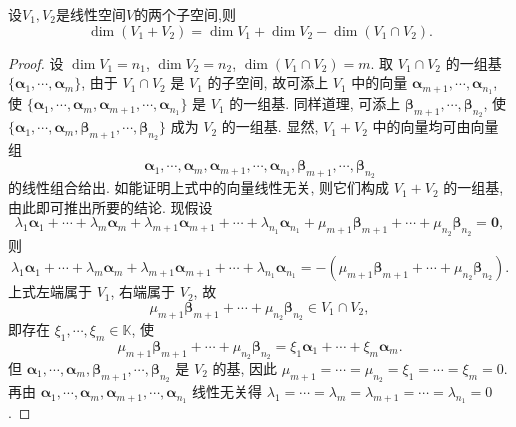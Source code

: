 \documentclass[../../main.tex]{subfiles}%
\begin{document}
\begin{theorem}[交和空间维数公式]\label{theorem:交和空间维数公式}
设\(V_1,V_2\)是线性空间\(V\)的两个子空间,则
\[
\dim(V_1 + V_2)=\dim V_1+\dim V_2-\dim(V_1\cap V_2).
\]
\end{theorem}
\begin{proof}

设 $\dim V_1 = n_1$, $\dim V_2 = n_2$, $\dim(V_1 \cap V_2) = m$. 取 $V_1 \cap V_2$ 的一组基 $\{\boldsymbol{\alpha}_1, \cdots, \boldsymbol{\alpha}_m\}$, 由于 $V_1 \cap V_2$ 是 $V_1$ 的子空间, 故可添上 $V_1$ 中的向量 $\boldsymbol{\alpha}_{m + 1}, \cdots, \boldsymbol{\alpha}_{n_1}$, 使 $\{\boldsymbol{\alpha}_1, \cdots, \boldsymbol{\alpha}_m, \boldsymbol{\alpha}_{m + 1}, \cdots, \boldsymbol{\alpha}_{n_1}\}$ 是 $V_1$ 的一组基. 同样道理, 可添上 $\boldsymbol{\beta}_{m + 1}, \cdots, \boldsymbol{\beta}_{n_2}$, 使 $\{\boldsymbol{\alpha}_1, \cdots, \boldsymbol{\alpha}_m, \boldsymbol{\beta}_{m + 1}, \cdots, \boldsymbol{\beta}_{n_2}\}$ 成为 $V_2$ 的一组基. 显然, $V_1 + V_2$ 中的向量均可由向量组
$$
\boldsymbol{\alpha}_1, \cdots, \boldsymbol{\alpha}_m, \boldsymbol{\alpha}_{m + 1}, \cdots, \boldsymbol{\alpha}_{n_1}, \boldsymbol{\beta}_{m + 1}, \cdots, \boldsymbol{\beta}_{n_2}
$$
的线性组合给出. 如能证明上式中的向量线性无关, 则它们构成 $V_1 + V_2$ 的一组基, 由此即可推出所要的结论. 现假设
$$
\lambda_1\boldsymbol{\alpha}_1 + \cdots + \lambda_m\boldsymbol{\alpha}_m + \lambda_{m + 1}\boldsymbol{\alpha}_{m + 1} + \cdots + \lambda_{n_1}\boldsymbol{\alpha}_{n_1} + \mu_{m + 1}\boldsymbol{\beta}_{m + 1} + \cdots + \mu_{n_2}\boldsymbol{\beta}_{n_2} = \boldsymbol{0},
$$
则
$$
\lambda_1\boldsymbol{\alpha}_1 + \cdots + \lambda_m\boldsymbol{\alpha}_m + \lambda_{m + 1}\boldsymbol{\alpha}_{m + 1} + \cdots + \lambda_{n_1}\boldsymbol{\alpha}_{n_1} = -(\mu_{m + 1}\boldsymbol{\beta}_{m + 1} + \cdots + \mu_{n_2}\boldsymbol{\beta}_{n_2}).
$$
上式左端属于 $V_1$, 右端属于 $V_2$, 故
$$
\mu_{m + 1}\boldsymbol{\beta}_{m + 1} + \cdots + \mu_{n_2}\boldsymbol{\beta}_{n_2} \in V_1 \cap V_2,
$$
即存在 $\xi_1, \cdots, \xi_m \in \mathbb{K}$, 使
$$
\mu_{m + 1}\boldsymbol{\beta}_{m + 1} + \cdots + \mu_{n_2}\boldsymbol{\beta}_{n_2} = \xi_1\boldsymbol{\alpha}_1 + \cdots + \xi_m\boldsymbol{\alpha}_m.
$$
但 $\boldsymbol{\alpha}_1, \cdots, \boldsymbol{\alpha}_m, \boldsymbol{\beta}_{m + 1}, \cdots, \boldsymbol{\beta}_{n_2}$ 是 $V_2$ 的基, 因此 $\mu_{m + 1} = \cdots = \mu_{n_2} = \xi_1 = \cdots = \xi_m = 0$. 再由 $\boldsymbol{\alpha}_1, \cdots, \boldsymbol{\alpha}_m, \boldsymbol{\alpha}_{m + 1}, \cdots, \boldsymbol{\alpha}_{n_1}$ 线性无关得 $\lambda_1 = \cdots = \lambda_m = \lambda_{m + 1} = \cdots = \lambda_{n_1} = 0$. 

\end{proof}
\end{document}
